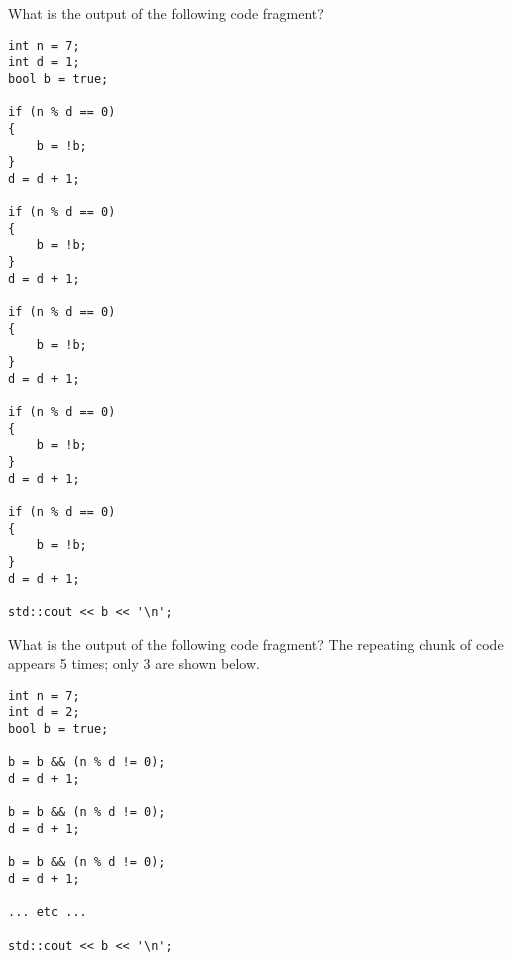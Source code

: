 \newpage
\nextq
What is the output of the following code fragment?
\begin{Verbatim}[frame=single,fontsize=\footnotesize]
int n = 7;
int d = 1;
bool b = true;

if (n % d == 0)
{
    b = !b;
}
d = d + 1;

if (n % d == 0)
{
    b = !b;
}
d = d + 1;

if (n % d == 0)
{
    b = !b;
}
d = d + 1;

if (n % d == 0)
{
    b = !b;
}
d = d + 1;

if (n % d == 0)
{
    b = !b;
}
d = d + 1;

std::cout << b << '\n';
\end{Verbatim}
\ANSWER
\begin{answercode}

\end{answercode}

\newpage
\nextq
What is the output of the following code fragment?
The repeating chunk of code appears 5 times; only 3 are shown below.
\begin{Verbatim}[frame=single,fontsize=\footnotesize]
int n = 7;
int d = 2;
bool b = true;

b = b && (n % d != 0);
d = d + 1;

b = b && (n % d != 0);
d = d + 1;

b = b && (n % d != 0);
d = d + 1;

... etc ...

std::cout << b << '\n';
\end{Verbatim}
\ANSWER
\begin{answercode}

\end{answercode}


